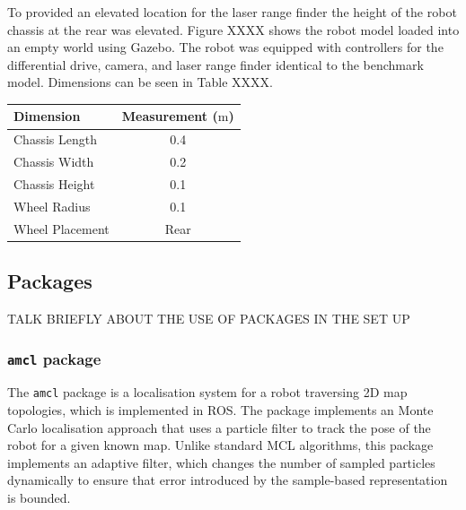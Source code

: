 \documentclass[a4paper]{article}
\begin{document}
\begin{minipage}{0.45\textwidth}
To provided an elevated location for the laser range finder the height of the robot chassis at the rear was elevated. Figure XXXX shows the robot model loaded into an empty world using Gazebo. The robot was equipped with controllers for the differential drive, camera, and laser range finder identical to the benchmark model. Dimensions can be seen in Table XXXX.
\end{minipage}
\hspace{1cm}
\begin{minipage}{0.45\textwidth}
\centering
{}
\begin{tabular}{lc}
\toprule
\textbf{Dimension} & \textbf{Measurement ($\si{\meter}$)} \\
\midrule
Chassis Length & 0.4\\
Chassis Width & 0.2\\
Chassis Height & 0.1\\
Wheel Radius & 0.1\\
Wheel Placement & Rear\\
\bottomrule
\end{tabular}
\end{minipage}

\subsection{Packages}
TALK BRIEFLY ABOUT THE USE OF PACKAGES IN THE SET UP
\subsubsection{\texttt{amcl} package}
The \texttt{amcl} package is a localisation system for a robot traversing 2D map topologies, which is implemented in ROS. The package implements an Monte Carlo localisation approach that uses a particle filter to track the pose of the robot for a given known map. Unlike standard MCL algorithms, this package implements an adaptive filter, which changes the number of sampled particles dynamically to ensure that error introduced by the sample-based representation is bounded.
\end{document}
